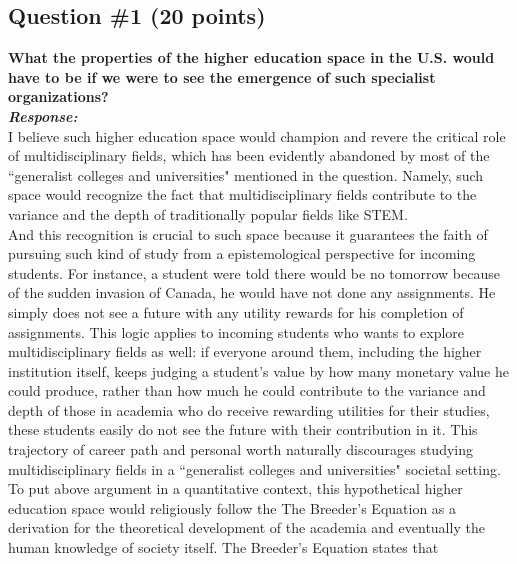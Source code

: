 \documentclass[12pt]{article}
\title{SOCIOL 110 Take-Home Midterm Exam #1}
\author{\textbf{David Pan} \\ SID: 3034151358}
\newcommand\tab[1][1cm]{\hspace*{#1}}
\begin{document}
\maketitle

\vspace{0.5in}


\pagebreak
\subsection*{Question \#1 (20 points)}
\textbf{What the properties of the higher education space in the U.S. would have to be if we were to see the emergence of such specialist organizations? }\\


\textbf{\emph{Response: }} \\
\tab I believe such higher education space would champion and revere the critical role of multidisciplinary fields, which has been evidently abandoned by most of the  ``generalist colleges and universities" mentioned in the question. Namely, such space would recognize the fact that multidisciplinary fields contribute to the variance and the depth of traditionally popular fields like STEM. \\
\tab And this recognition is crucial to such space because it guarantees the faith of pursuing such kind of study from a epistemological perspective for incoming students. For instance, a student were told there would be no tomorrow because of the sudden invasion of Canada, he would have not done any assignments. He simply does not see a future with any utility rewards for his completion of assignments. This logic applies to incoming students who wants to explore multidisciplinary fields as well: if everyone around them, including the higher institution itself, keeps judging a student's value by how many monetary value he could produce, rather than how much he could contribute to the variance and depth of those in academia who do receive rewarding utilities for their studies, these students easily do not see the future with their contribution in it. This trajectory of career path and personal worth naturally discourages studying multidisciplinary fields in a ``generalist colleges and universities" societal setting.  \\
\tab To put above argument in a quantitative context, this hypothetical higher education space would religiously follow the The Breeder's Equation as a derivation for the theoretical development of the academia and eventually the human knowledge of society itself. The Breeder's Equation states that
\end{document}
